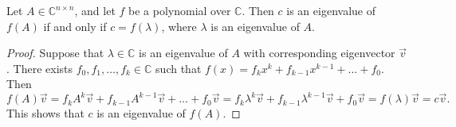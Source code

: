 \documentclass{homework}
\begin{document}
	\question Let $A \in \mathbb{C}^{n\times n}$, and let $f$ be a polynomial over $\mathbb{C}$. Then $c$ is an eigenvalue of $f(A)$ if and only if $c = f(\lambda)$, where $\lambda$ is an eigenvalue of $A$.
	
	\begin{proof}
		Suppose that $\lambda \in \mathbb{C}$ is an eigenvalue of $A$ with corresponding eigenvector $\vec{v}$. There exists $f_0,f_1,\dots,f_k \in \mathbb{C}$ such that  $f(x) = f_kx^k +f_{k-1}x^{k-1} + \dots + f_0$. Then
		\begin{equation*}
			f(A)\vec{v} = f_kA^k\vec{v} + f_{k-1}A^{k-1}\vec{v} + \dots + f_0\vec{v} = f_k\lambda^k\vec{v} + f_{k-1}\lambda^{k-1}\vec{v} + f_0\vec{v} = f(\lambda)\vec{v} = c\vec{v}.
		\end{equation*}
		This shows that $c$ is an eigenvalue of $f(A)$.
		

\end{proof}
\end{document}
